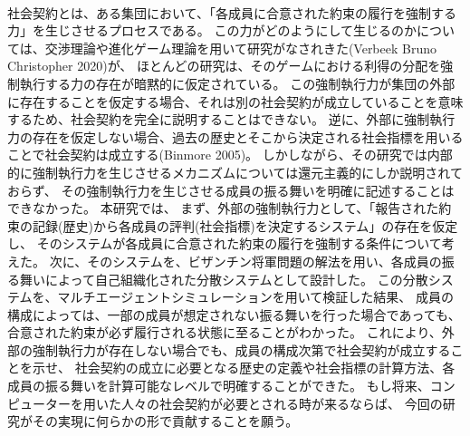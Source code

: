 
~ \\
  社会契約とは、ある集団において、「各成員に合意された約束の履行を強制する力」を生じさせるプロセスである。
  この力がどのようにして生じるのかについては、交渉理論や進化ゲーム理論を用いて研究がなされきた(Verbeek Bruno Christopher 2020)\cite{sep-game-ethics}が、
  ほとんどの研究は、そのゲームにおける利得の分配を強制執行する力の存在が暗黙的に仮定されている。
  この強制執行力が集団の外部に存在することを仮定する場合、それは別の社会契約が成立していることを意味するため、社会契約を完全に説明することはできない。
  逆に、外部に強制執行力の存在を仮定しない場合、過去の歴史とそこから決定される社会指標を用いることで社会契約は成立する(Binmore 2005)。
  しかしながら、その研究では内部的に強制執行力を生じさせるメカニズムについては還元主義的にしか説明されておらず、
  その強制執行力を生じさせる成員の振る舞いを明確に記述することはできなかった。
  本研究では、
  まず、外部の強制執行力として、「報告された約束の記録(歴史)から各成員の評判(社会指標)を決定するシステム」の存在を仮定し、
  そのシステムが各成員に合意された約束の履行を強制する条件について考えた。
  次に、そのシステムを、ビザンチン将軍問題の解法を用い、各成員の振る舞いによって自己組織化された分散システムとして設計した。
  この分散システムを、マルチエージェントシミュレーションを用いて検証した結果、
  成員の構成によっては、一部の成員が想定されない振る舞いを行った場合であっても、
  合意された約束が必ず履行される状態に至ることがわかった。
  これにより、外部の強制執行力が存在しない場合でも、成員の構成次第で社会契約が成立することを示せ、
  社会契約の成立に必要となる歴史の定義や社会指標の計算方法、各成員の振る舞いを計算可能なレベルで明確することができた。
  もし将来、コンピューターを用いた人々の社会契約が必要とされる時が来るならば、
  今回の研究がその実現に何らかの形で貢献することを願う。
~ \\